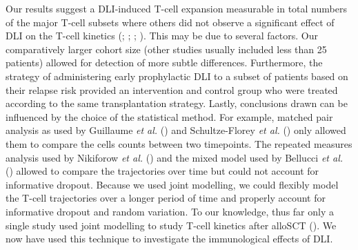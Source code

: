 \documentclass[
  letterpaper,
  paper=240mm:170mm,
  twoside=true,
  open=right,
  fontsize=10pt,
  pagesize=false,
  BCOR=15mm,
  DIV=14,
  headinclude=true,
  footinclude=false,
  headsepline=on]{scrbook}
\begin{document}
Our results suggest a DLI-induced T-cell expansion measurable in total
numbers of the major T-cell subsets where others did not observe a
significant effect of DLI on the T-cell kinetics
(;
;
;
). This may be due to several factors. Our
comparatively larger cohort size (other studies usually included less
than 25 patients) allowed for detection of more subtle differences.
Furthermore, the strategy of administering early prophylactic DLI to a
subset of patients based on their relapse risk provided an intervention
and control group who were treated according to the same transplantation
strategy. Lastly, conclusions drawn can be influenced by the choice of
the statistical method. For example, matched pair analysis as used by
Guillaume \emph{et al.}
() and
Schultze-Florey \emph{et al.}
() only
allowed them to compare the cells counts between two timepoints. The
repeated measures analysis used by Nikiforow \emph{et al.}
() and the mixed model
used by Bellucci \emph{et al.}
()
allowed to compare the trajectories over time but could not account for
informative dropout. Because we used joint modelling, we could flexibly
model the T-cell trajectories over a longer period of time and properly
account for informative dropout and random variation. To our knowledge,
thus far only a single study used joint modelling to study T-cell
kinetics after alloSCT
(). We now have used this technique to investigate
the immunological effects of DLI.
\end{document}
